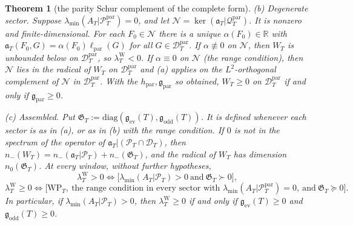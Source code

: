 \documentclass[11pt]{amsart}
\newtheorem{theorem}{Theorem}[section]
\theoremstyle{definition}
\theoremstyle{remark}
\newcommand{\R}{\mathbb R}
\newcommand{\PT}{\mathcal P_T}
\newcommand{\lamW}{\lambda^{\mathrm W}_T}
\newcommand{\lamA}{\lambda_{\min}(A_T|\PT)}
\begin{document}
\begin{theorem}[the parity Schur complement of the complete form]
\emph{(b) Degenerate sector.} Suppose $\lambda_{\min}(A_T|\PT^{\mathrm{par}})=0$, and let
$\mathcal N=\ker(\mathfrak a_T|\mathcal Q^{\mathrm{par}}_T)$. It is nonzero and finite-dimensional. For each
$F_0\in\mathcal N$ there is a unique $\alpha(F_0)\in\R$ with $\mathfrak a_T(F_0,G)=\alpha(F_0)\ell_{\mathrm{par}}(G)$
for all $G\in\mathcal D^{\mathrm{par}}_T$. If $\alpha\not\equiv0$ on $\mathcal N$, then $W_T$ is unbounded below on
$\mathcal D^{\mathrm{par}}_T$, so $\lamW<0$. If $\alpha\equiv0$ on $\mathcal N$ (the \emph{range condition}), then
$\mathcal N$ lies in the radical of $W_T$ on $\mathcal D^{\mathrm{par}}_T$ and (a) applies on the $L^2$-orthogonal
complement of $\mathcal N$ in $\mathcal D^{\mathrm{par}}_T$. With the $h_{\mathrm{par}},\mathfrak g_{\mathrm{par}}$ so obtained,
$W_T\ge0$ on $\mathcal D^{\mathrm{par}}_T$ if and only if $\mathfrak g_{\mathrm{par}}\ge0$.

\emph{(c) Assembled.} Put $\mathfrak G_T:=\mathrm{diag}(\mathfrak g_{\mathrm{ev}}(T),\mathfrak g_{\mathrm{odd}}(T))$. It is
defined whenever each sector is as in (a), or as in (b) with the range condition. If $0$ is not in the
spectrum of the operator of $\mathfrak a_T|(\PT\cap\mathcal D_T)$, then
$n_-(W_T)=n_-(\mathfrak a_T|\PT)+n_-(\mathfrak G_T)$, and the radical of $W_T$ has dimension $n_0(\mathfrak G_T)$. At every window,
without further hypotheses,
\[
\lamW>0\iff\big[\lamA>0\ \text{and}\ \mathfrak G_T\succ0\big],
\]
\[
\lamW\ge0\iff\big[\mathrm{WP}_T,\ \text{the range condition in every sector with }
\lambda_{\min}(A_T|\PT^{\mathrm{par}})=0,\ \text{and}\ \mathfrak G_T\succeq0\big].
\]
In particular, if $\lamA>0$, then $\lamW\ge0$ if and only if $\mathfrak g_{\mathrm{ev}}(T)\ge0$ and
$\mathfrak g_{\mathrm{odd}}(T)\ge0$.
\end{theorem}
\end{document}

